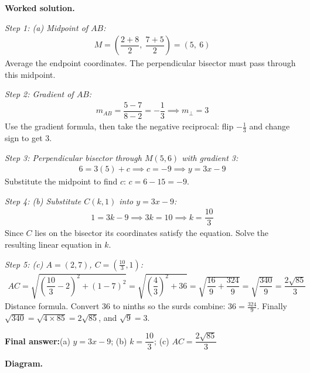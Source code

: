 \documentclass[11pt]{article}
\begin{document}
\textbf{Worked solution.}

\textit{Step 1: (a) Midpoint of \( AB \):}
\[\begin{gathered}
M = \left(\dfrac{2+8}{2},\ \dfrac{7+5}{2}\right) = (5,\ 6)
\end{gathered}\]
Average the endpoint coordinates. The perpendicular bisector must pass through this midpoint.

\textit{Step 2: Gradient of \( AB \):}
\[\begin{gathered}
m_{AB} = \dfrac{5-7}{8-2} = -\dfrac{1}{3} \implies m_\perp = 3
\end{gathered}\]
Use the gradient formula, then take the negative reciprocal: flip \( -\tfrac{1}{3} \) and change sign to get \( 3 \).

\textit{Step 3: Perpendicular bisector through \( M(5,6) \) with gradient 3:}
\[\begin{gathered}
6 = 3(5) + c \implies c = -9 \implies y = 3x - 9
\end{gathered}\]
Substitute the midpoint to find \( c \): \( c = 6 - 15 = -9 \).

\textit{Step 4: (b) Substitute \( C(k, 1) \) into \( y = 3x - 9 \):}
\[\begin{gathered}
1 = 3k - 9 \implies 3k = 10 \implies k = \dfrac{10}{3}
\end{gathered}\]
Since \( C \) lies on the bisector its coordinates satisfy the equation. Solve the resulting linear equation in \( k \).

\textit{Step 5: (c) \( A = (2, 7) \), \( C = \left(\frac{10}{3}, 1\right) \):}
\[\begin{gathered}
AC = \sqrt{\left(\dfrac{10}{3}-2\right)^2 + (1-7)^2} = \sqrt{\left(\dfrac{4}{3}\right)^2 + 36} = \sqrt{\dfrac{16}{9} + \dfrac{324}{9}} = \sqrt{\dfrac{340}{9}} = \dfrac{2\sqrt{85}}{3}
\end{gathered}\]
Distance formula. Convert \( 36 \) to ninths so the surds combine: \( 36 = \tfrac{324}{9} \). Finally \( \sqrt{340} = \sqrt{4 \times 85} = 2\sqrt{85} \), and \( \sqrt{9} = 3 \).

\begin{answerbox}
\textbf{Final answer:}\quad (a) \(\displaystyle y = 3x - 9\); (b) \(\displaystyle k = \dfrac{10}{3}\); (c) \(\displaystyle AC = \dfrac{2\sqrt{85}}{3}\)
\end{answerbox}
\textbf{Diagram.}
\end{document}
